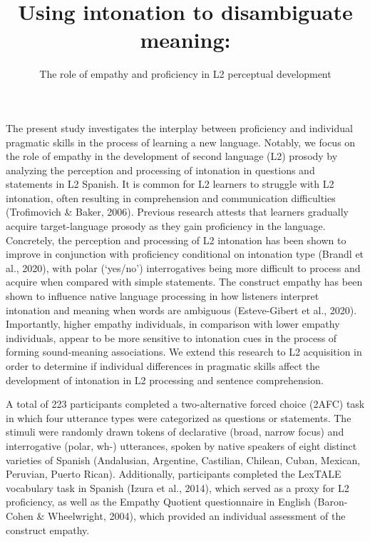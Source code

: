 \documentclass[
  12pt,
]{article}
\title{Using intonation to disambiguate meaning:}
\subtitle{The role of empathy and proficiency in L2 perceptual
development}
\author{}
\date{\vspace{-2.5em}}
\begin{document}
\maketitle

The present study investigates the interplay between proficiency and
individual pragmatic skills in the process of learning a new language.
Notably, we focus on the role of empathy in the development of second
language (L2) prosody by analyzing the perception and processing of
intonation in questions and statements in L2 Spanish. It is common for
L2 learners to struggle with L2 intonation, often resulting in
comprehension and communication difficulties (Trofimovich \& Baker,
2006). Previous research attests that learners gradually acquire
target-language prosody as they gain proficiency in the language.
Concretely, the perception and processing of L2 intonation has been
shown to improve in conjunction with proficiency conditional on
intonation type (Brandl et al., 2020), with polar (`yes/no')
interrogatives being more difficult to process and acquire when compared
with simple statements. The construct empathy has been shown to
influence native language processing in how listeners interpret
intonation and meaning when words are ambiguous (Esteve-Gibert et al.,
2020). Importantly, higher empathy individuals, in comparison with lower
empathy individuals, appear to be more sensitive to intonation cues in
the process of forming sound-meaning associations. We extend this
research to L2 acquisition in order to determine if individual
differences in pragmatic skills affect the development of intonation in
L2 processing and sentence comprehension.

A total of 223 participants completed a two-alternative forced choice
(2AFC) task in which four utterance types were categorized as questions
or statements. The stimuli were randomly drawn tokens of declarative
(broad, narrow focus) and interrogative (polar, wh-) utterances, spoken
by native speakers of eight distinct varieties of Spanish (Andalusian,
Argentine, Castilian, Chilean, Cuban, Mexican, Peruvian, Puerto Rican).
Additionally, participants completed the LexTALE vocabulary task in
Spanish (Izura et al., 2014), which served as a proxy for L2
proficiency, as well as the Empathy Quotient questionnaire in English
(Baron-Cohen \& Wheelwright, 2004), which provided an individual
assessment of the construct empathy.
\end{document}
